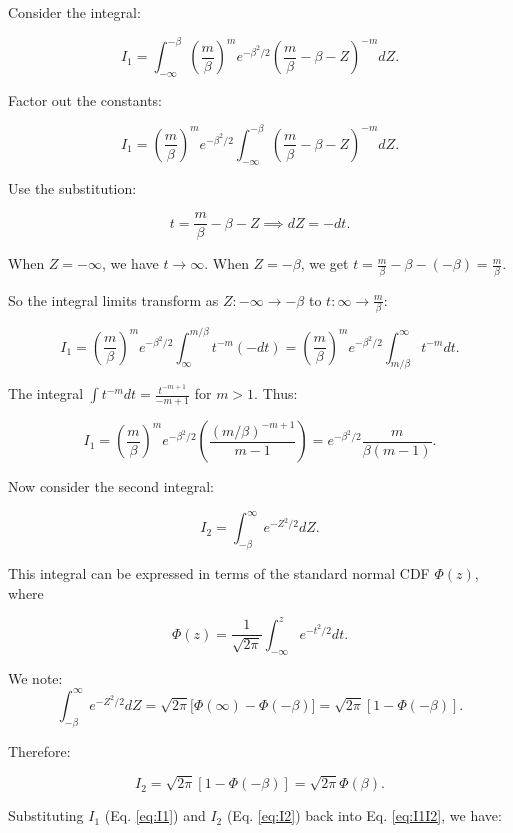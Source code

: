 \documentclass{article}
\begin{document}
Consider the integral:

$$
I_1 = \int_{-\infty}^{- \beta} \left(\frac{m}{\beta}\right)^m e^{-\beta^2/2} \left(\frac{m}{\beta} - \beta - Z\right)^{-m} dZ.
$$

Factor out the constants:

\begin{equation}
\label{eq:I1}
    I_1 = \left(\frac{m}{\beta}\right)^m e^{-\beta^2/2} \int_{-\infty}^{- \beta} \left(\frac{m}{\beta} - \beta - Z\right)^{-m} dZ.
\end{equation}

Use the substitution:

$$
t = \frac{m}{\beta} - \beta - Z \implies dZ = -dt.
$$

When $ Z = -\infty $, we have $ t \to \infty $.  
When $ Z = -\beta $, we get $t = \frac{m}{\beta} - \beta - (-\beta) = \frac{m}{\beta}.$

So the integral limits transform as $ Z: -\infty \to -\beta $ to $ t: \infty \to \frac{m}{\beta} $:

$$
I_1 = \left(\frac{m}{\beta}\right)^m e^{-\beta^2/2} \int_{\infty}^{m/\beta} t^{-m}(-dt) = \left(\frac{m}{\beta}\right)^m e^{-\beta^2/2} \int_{m/\beta}^{\infty} t^{-m} dt.
$$

The integral $\int t^{-m} dt = \frac{t^{-m+1}}{-m+1}$ for $m > 1$. Thus:

$$
I_1 = \left(\frac{m}{\beta}\right)^m e^{-\beta^2/2} \left(\frac{(m/\beta)^{-m+1}}{m-1} \right) = e^{-\beta^2/2} \frac{m}{\beta(m-1)}.
$$

Now consider the second integral:

\begin{equation}
\label{eq:I2}
    I_2 = \int_{-\beta}^{\infty} e^{-Z^2/2} dZ.
\end{equation}

This integral can be expressed in terms of the standard normal CDF $\Phi(z)$, where

$$
\Phi(z) = \frac{1}{\sqrt{2\pi}} \int_{-\infty}^{z} e^{-t^2/2} dt.
$$

We note:
$$
\int_{-\beta}^{\infty} e^{-Z^2/2} dZ = \sqrt{2\pi}\big[ \Phi(\infty) - \Phi(-\beta) \big] = \sqrt{2\pi}\left[1 - \Phi(-\beta)\right].
$$

Therefore:

$$
I_2 = \sqrt{2\pi} \left[ 1 - \Phi(-\beta) \right] = \sqrt{2\pi} \Phi(\beta).
$$

Substituting $I_1$ (Eq. \ref{eq:I1}) and $I_2$ (Eq. \ref{eq:I2}) back into Eq. \ref{eq:I1I2}, we have:
\end{document}
